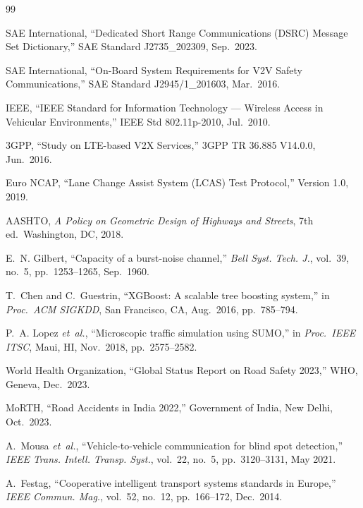 \documentclass[sn-mathphys-num,Numbered,iicol]{sn-jnl}
\begin{document}
\begin{thebibliography}{99}

SAE International, ``Dedicated Short Range Communications (DSRC) Message
Set Dictionary,'' SAE Standard J2735\_202309, Sep.\ 2023.

SAE International, ``On-Board System Requirements for V2V Safety
Communications,'' SAE Standard J2945/1\_201603, Mar.\ 2016.

IEEE, ``IEEE Standard for Information Technology --- Wireless Access in
Vehicular Environments,'' IEEE Std 802.11p-2010, Jul.\ 2010.

3GPP, ``Study on LTE-based V2X Services,'' 3GPP TR 36.885 V14.0.0, Jun.\ 2016.

Euro NCAP, ``Lane Change Assist System (LCAS) Test Protocol,'' Version 1.0, 2019.

AASHTO, \textit{A Policy on Geometric Design of Highways and Streets},
7th ed.\ Washington, DC, 2018.

E.~N. Gilbert, ``Capacity of a burst-noise channel,'' \textit{Bell Syst.
Tech. J.}, vol.~39, no.~5, pp.~1253--1265, Sep.\ 1960.

T.~Chen and C.~Guestrin, ``XGBoost: A scalable tree boosting system,'' in
\textit{Proc.\ ACM SIGKDD}, San Francisco, CA, Aug.\ 2016, pp.~785--794.

P.~A. Lopez \textit{et~al.}, ``Microscopic traffic simulation using SUMO,''
in \textit{Proc.\ IEEE ITSC}, Maui, HI, Nov.\ 2018, pp.~2575--2582.

World Health Organization, ``Global Status Report on Road Safety 2023,''
WHO, Geneva, Dec.\ 2023.

MoRTH, ``Road Accidents in India 2022,'' Government of India, New Delhi,
Oct.\ 2023.

A.~Mousa \textit{et~al.}, ``Vehicle-to-vehicle communication for blind spot
detection,'' \textit{IEEE Trans. Intell. Transp. Syst.}, vol.~22, no.~5,
pp.~3120--3131, May 2021.

A.~Festag, ``Cooperative intelligent transport systems standards in
Europe,'' \textit{IEEE Commun. Mag.}, vol.~52, no.~12, pp.~166--172, Dec.\ 2014.


\end{thebibliography}
\end{document}
